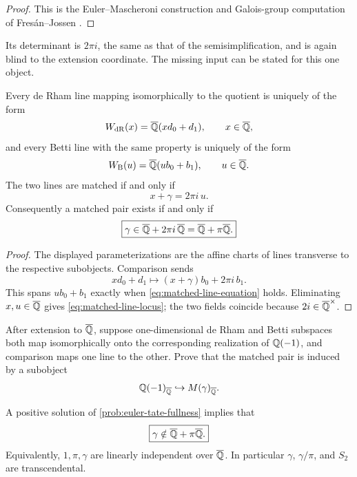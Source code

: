 \begin{proof}
This is the Euler--Mascheroni construction and Galois-group computation of
Fres\'an--Jossen \cite[\S12.8]{FresanJossen2024}.
\end{proof}

Its determinant is \(2\pi i\), the same as that of the semisimplification,
and is again blind to the extension coordinate.  The missing input can be
stated for this one object.

\begin{proposition}
\label{prop:matched-line-classification}
Every de Rham line mapping isomorphically to the quotient is uniquely of
the form
\[
 W_{\mathrm{dR}}(x)=\overline{\mathbb Q}(xd_0+d_1),\qquad x\in\overline{\mathbb Q},
\]
and every Betti line with the same property is uniquely of the form
\[
 W_{\mathrm B}(u)=\overline{\mathbb Q}(ub_0+b_1),\qquad u\in\overline{\mathbb Q}.
\]
The two lines are matched if and only if
\begin{equation}\label{eq:matched-line-equation}
 \boxed{x+\gamma=2\pi i\,u.}
\end{equation}
Consequently a matched pair exists if and only if
\begin{equation}\label{eq:matched-line-locus}
 \boxed{\gamma\in\overline{\mathbb Q}+2\pi i\,\overline{\mathbb Q}
              =\overline{\mathbb Q}+\pi\overline{\mathbb Q}.}
\end{equation}
\end{proposition}

\begin{proof}
The displayed parameterizations are the affine charts of lines transverse
to the respective subobjects.  Comparison sends
\[
 xd_0+d_1\longmapsto(x+\gamma)b_0+2\pi i\,b_1.
\]
This spans \(ub_0+b_1\) exactly when
\eqref{eq:matched-line-equation} holds.  Eliminating \(x,u\in\overline{\mathbb Q}\)
gives \eqref{eq:matched-line-locus}; the two fields coincide because
\(2i\in\overline{\mathbb Q}^\times\).
\end{proof}

\begin{problem}
\label{prob:euler-tate-fullness}
After extension to \(\overline{\mathbb Q}\), suppose one-dimensional de Rham and Betti
subspaces both map isomorphically onto the corresponding realization of
\(\mathbb Q(-1)\), and comparison maps one line to the other.  Prove that the
matched pair is induced by a subobject
\[
 \mathbb Q(-1)_{\overline{\mathbb Q}}\hookrightarrow M(\gamma)_{\overline{\mathbb Q}}.
\]
\end{problem}

\begin{theorem}
\label{thm:matched-line-implies-gamma}
A positive solution of \cref{prob:euler-tate-fullness} implies that
\begin{equation}\label{eq:matched-line-payoff}
 \boxed{\gamma\notin\overline{\mathbb Q}+\pi\overline{\mathbb Q}.}
\end{equation}
Equivalently, \(1,\pi,\gamma\) are linearly independent over \(\overline{\mathbb Q}\).
In particular \(\gamma\), \(\gamma/\pi\), and \(S_2\) are transcendental.
\end{theorem}

